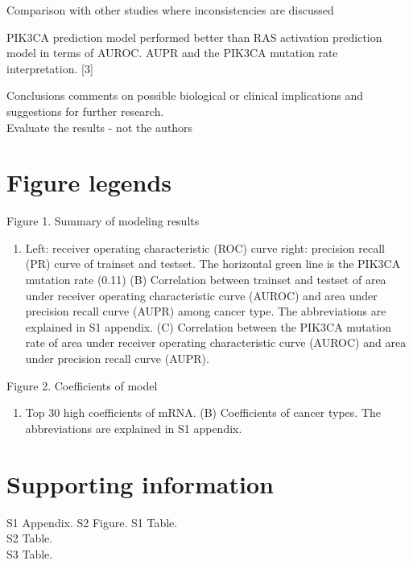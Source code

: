 \documentclass[10pt,letterpaper]{article}
\providecommand{\tightlist}{%
  \setlength{\itemsep}{0pt}\setlength{\parskip}{0pt}}
\begin{document}
Comparison with other studies where inconsistencies are discussed

PIK3CA prediction model performed better than RAS activation prediction
model in terms of AUROC. AUPR and the PIK3CA mutation rate
interpretation. {[}3{]}

Conclusions comments on possible biological or clinical implications and
suggestions for further research.\\
Evaluate the results - not the authors

\hypertarget{figure-legends}{%
\section{Figure legends}\label{figure-legends}}

Figure 1. Summary of modeling results

\begin{enumerate}
\def\labelenumi{(\Alph{enumi})}
\tightlist
\item
  Left: receiver operating characteristic (ROC) curve right: precision
  recall (PR) curve of trainset and testset. The horizontal green line
  is the PIK3CA mutation rate (0.11) (B) Correlation between trainset
  and testset of area under receiver operating characteristic curve
  (AUROC) and area under precision recall curve (AUPR) among cancer
  type. The abbreviations are explained in S1 appendix. (C) Correlation
  between the PIK3CA mutation rate of area under receiver operating
  characteristic curve (AUROC) and area under precision recall curve
  (AUPR).
\end{enumerate}

Figure 2. Coefficients of model

\begin{enumerate}
\def\labelenumi{(\Alph{enumi})}
\tightlist
\item
  Top 30 high coefficients of mRNA. (B) Coefficients of cancer types.
  The abbreviations are explained in S1 appendix.
\end{enumerate}

\hypertarget{supporting-information}{%
\section{Supporting information}\label{supporting-information}}

S1 Appendix. S2 Figure. S1 Table.\\
S2 Table.\\
S3 Table.
\end{document}
